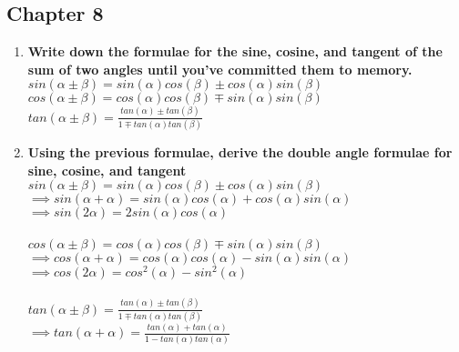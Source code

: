 \clearpage
\subsection{Chapter 8}

\begin{enumerate}

\item{\bf Write down the formulae for the sine, cosine, and tangent of the sum of two angles until you've committed them to memory.}\\

\tab$sin(\alpha \pm \beta) = sin(\alpha)cos(\beta) \pm cos(\alpha)sin(\beta)$\\

\tab$cos(\alpha \pm \beta) = cos(\alpha)cos(\beta) \mp sin(\alpha)sin(\beta)$\\

\tab$tan(\alpha \pm \beta) = \frac{tan(\alpha) \pm tan(\beta)}{1 \mp tan(\alpha)tan(\beta)}$\\



\item{\bf Using the previous formulae, derive the double angle formulae for sine, cosine, and tangent}\\

\tab$sin(\alpha \pm \beta) = sin(\alpha)cos(\beta) \pm cos(\alpha)sin(\beta)$\\

\tab$\implies sin(\alpha + \alpha) = sin(\alpha)cos(\alpha) + cos(\alpha)sin(\alpha)$\\

\tab$\implies sin(2\alpha) = 2sin(\alpha)cos(\alpha)$\\ \\


\tab$cos(\alpha \pm \beta) = cos(\alpha)cos(\beta) \mp sin(\alpha)sin(\beta)$\\

\tab$\implies cos(\alpha + \alpha) = cos(\alpha)cos(\alpha) - sin(\alpha)sin(\alpha)$\\

\tab$\implies cos(2\alpha) = cos^2(\alpha) - sin^2(\alpha)$\\ \\


\tab$tan(\alpha \pm \beta) = \frac{tan(\alpha) \pm tan(\beta)}{1 \mp tan(\alpha)tan(\beta)}$\\

\tab$\implies tan(\alpha + \alpha) = \frac{tan(\alpha) + tan(\alpha)}{1 - tan(\alpha)tan(\alpha)}$\\


\end{enumerate}
